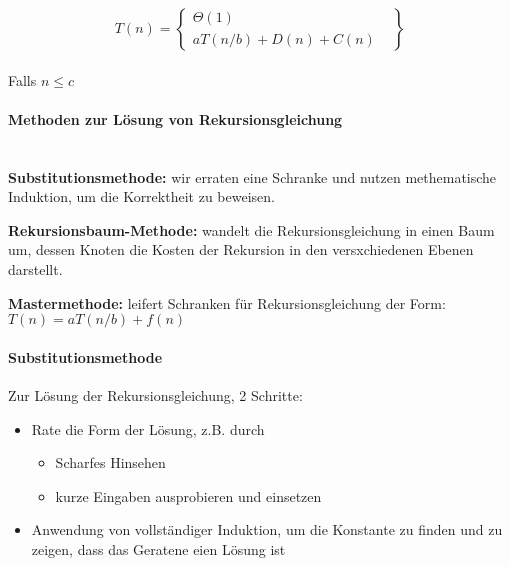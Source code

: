	\begin{center}
		\[
			T(n) = \left\{\begin{array}{lr}
				\Theta (1) & \\
				aT(n/b) + D(n) + C(n) &
				\end{array}\right\}
		\] \\
		Falls $n \leq c$ \vspace{1cm}
	\end{center}


	\paragraph{Methoden zur Lösung von Rekursionsgleichung} \mbox{} \\

	\noindent \textbf{Substitutionsmethode:} wir erraten eine Schranke und nutzen methematische Induktion, 
	um die Korrektheit zu beweisen.

	\noindent \textbf{Rekursionsbaum-Methode:} wandelt die Rekursionsgleichung in einen Baum um, 
	dessen Knoten die Kosten der Rekursion in den versxchiedenen Ebenen darstellt.

	\noindent \textbf{Mastermethode:} leifert Schranken für Rekursionsgleichung der Form: $T(n) = aT(n/b) + f(n)$


	\paragraph{Substitutionsmethode}
	Zur Lösung der Rekursionsgleichung, 2 Schritte:
	\begin{itemize}
		\item Rate die Form der Lösung, z.B. durch 
		\begin{itemize}
			\item Scharfes Hinsehen
			\item kurze Eingaben ausprobieren und einsetzen
		\end{itemize}
		\item Anwendung von vollständiger Induktion, um die Konstante zu finden und zu zeigen, dass
			das Geratene eien Lösung ist
	\end{itemize}


